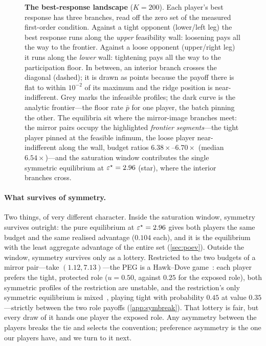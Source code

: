 \begin{figure}[!t]
\centering

\caption{\textbf{The best-response landscape} ($K=200$). Each
player's best response has three branches, read off the zero set of
the measured first-order condition. Against a tight opponent
(lower/left leg) the best response runs along the \emph{upper}
feasibility wall: loosening pays all the way to the frontier.
Against a loose opponent (upper/right leg) it runs along the
\emph{lower} wall: tightening pays all the way to the participation
floor. In between, an interior branch crosses the diagonal
(dashed); it is drawn as points because the payoff there is flat to
within $10^{-2}$ of its maximum and the ridge position is
near-indifferent. Grey marks the infeasible profiles; the dark
curve is the analytic frontier---the floor rate $\bar p$ for one
player, the batch pinning the other. The equilibria sit where the
mirror-image branches meet: the mirror pairs occupy the highlighted
\emph{frontier segments}---the tight player pinned at the feasible
infimum, the loose player near-indifferent along the wall, budget
ratios $6.38\times$--$6.70\times$ (median $6.54\times$)---and the
saturation window contributes the single symmetric equilibrium at
$\varepsilon^\star = 2.96$ (star), where the interior branches cross.}
\label{fig:C6}
\end{figure}



\paragraph{What survives of symmetry.} Two things, of very
different character. Inside the saturation window, symmetry
survives outright: the pure equilibrium at $\varepsilon^\star = 2.96$
gives both players the same budget and the same realised advantage
($0.104$ each), and it is the equilibrium with the least aggregate
advantage of the entire set (\cref{sec:poev}). Outside the window,
symmetry survives only as a lottery. Restricted to the two budgets
of a mirror pair---take $(1.12, 7.13)$---the \ac{PEG} is a
Hawk--Dove game~\cite{maynardsmith1973logic}: each player prefers
the tight, protected role ($u = 0.50$, against $0.25$ for the
exposed role), both symmetric profiles of the restriction are
unstable, and the restriction's only symmetric equilibrium is
mixed~\cite{nash1951noncooperative}, playing tight with
probability $0.45$ at value $0.35$---strictly between the two role
payoffs (\cref{app:symbreak}). That lottery is fair, but every
draw of it hands one player the exposed role. Any asymmetry
between the players breaks the tie and selects the convention;
preference asymmetry is the one our players have, and we turn to
it next.

